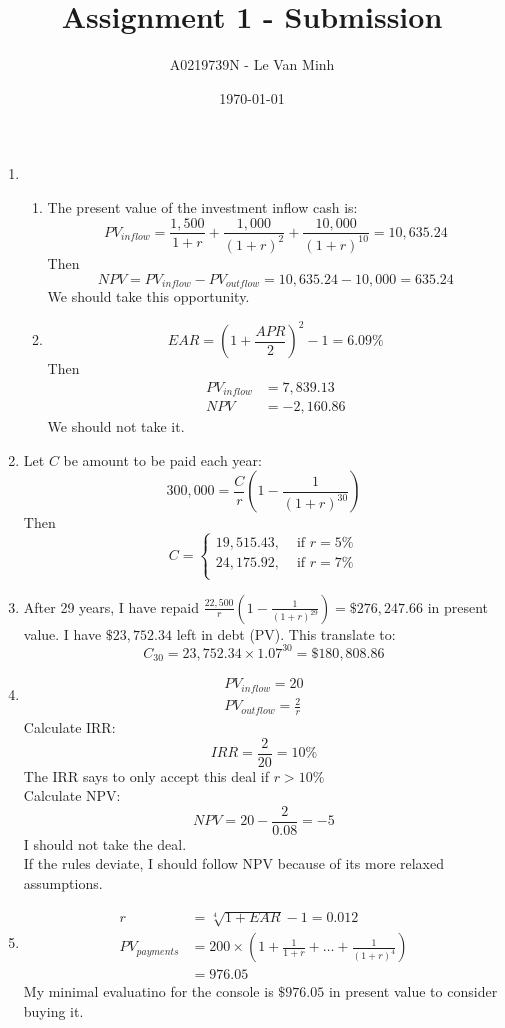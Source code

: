 \documentclass{article}
\title{Assignment 1 - Submission}
\author{A0219739N - Le Van Minh}
\date{\today}
\begin{document}
\maketitle
\begin{enumerate}
  \item \begin{enumerate}
    \item The present value of the investment inflow cash is:
      \[
        PV_{inflow} = \frac{1,500}{1+r} + \frac{1,000}{(1+r)^2} + \frac{10,000}{(1+r)^{10}} = 10,635.24
      \]
      Then
      \[
        NPV = PV_{inflow} - PV_{outflow} = 10,635.24 - 10,000 = 635.24
      \]
      We should take this opportunity.
    \item 
      \[
        EAR = \left(1 + \frac{APR}{2}\right)^2 - 1 = 6.09\%
      \]
      Then 
      \begin{align*}
        PV_{inflow} &= 7,839.13 \\
        NPV &= -2,160.86
      \end{align*}
      We should not take it.
  \end{enumerate}
  \item Let $C$ be amount to be paid each year:
    \[
      300,000 = \frac{C}{r} \left(1- \frac{1}{(1+r)^{30}}\right)
    \]
    Then 
    \[
      C = \begin{cases}
        19,515.43, &\text{ if } r = 5\% \\
        24,175.92, &\text{ if } r = 7\% \\
      \end{cases}
    \]
  \item After 29 years, I have repaid $\frac{22,500}{r} \left(1 - \frac{1}{(1+r)^{29}}\right)=\$276,247.66$ in present value. I have $\$23,752.34$ left in debt (PV). This translate to:
    \[
    C_{30} = 23,752.34 \times 1.07^{30} = \$180,808.86
    \]
  \item 
  \begin{align*}
    PV_{inflow} =  20 \\
    PV_{outflow} = \frac{2}{r}
  \end{align*}
  Calculate IRR:
  \[
    IRR = \frac{2}{20} = 10\%
  \]
  The IRR says to only accept this deal if $r > 10\%$ \\
  Calculate NPV:
  \[
    NPV = 20 - \frac{2}{0.08} = -5
  \]
  I should not take the deal. \\
  If the rules deviate, I should follow NPV because of its more relaxed assumptions.
  \item 
    \begin{align*}
      r &= \sqrt[4]{1 + EAR} - 1 = 0.012 \\
      PV_{payments} &= 200 \times \left(1 + \frac{1}{1+r} + \dots + \frac{1}{(1+r)^4} \right) \\
      &= 976.05
    \end{align*}
    My minimal evaluatino for the console is $\$976.05$ in present value to consider buying it.
\end{enumerate}
\end{document}
